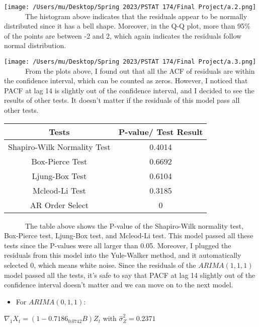 \documentclass[
]{article}
\providecommand{\tightlist}{%
  \setlength{\itemsep}{0pt}\setlength{\parskip}{0pt}}
\begin{document}
\texttt{[image: /Users/mu/Desktop/Spring 2023/PSTAT 174/Final Project/a.2.png]}\\

~~~~~~The histogram above indicates that the residuals appear to be
normally distributed since it has a bell shape. Moreover, in the Q-Q
plot, more than 95\% of the points are between -2 and 2, which again
indicates the residuals follow normal distribution.

\texttt{[image: /Users/mu/Desktop/Spring 2023/PSTAT 174/Final Project/a.3.png]}\\

~~~~~~From the plots above, I found out that all the ACF of residuals
are within the confidence interval, which can be counted as zeros.
However, I noticed that PACF at lag 14 is slightly out of the confidence
interval, and I decided to see the results of other tests. It doesn't
matter if the residuals of this model pass all other tests.

\hfill\break

\begin{longtable}[]{@{}cc@{}}
\toprule\noalign{}
Tests & P-value/ Test Result \\
\midrule\noalign{}
\endhead
\bottomrule\noalign{}
\endlastfoot
Shapiro-Wilk Normality Test & 0.4014 \\
Box-Pierce Test & 0.6692 \\
Ljung-Box Test & 0.6104 \\
Mcleod-Li Test & 0.3185 \\
AR Order Select & 0 \\
\end{longtable}

~~~~~~The table above shows the P-value of the Shapiro-Wilk normality
test, Box-Pierce test, Ljung-Box test, and Mcleod-Li test. This model
passed all these tests since the P-values were all larger than 0.05.
Moreover, I plugged the residuals from this model into the Yule-Walker
method, and it automatically selected 0, which means white noise. Since
the residuals of the \(ARIMA(1,1,1)\) model passed all the tests, it's
safe to say that PACF at lag 14 slightly out of the confidence interval
doesn't matter and we can move on to the next model.

\begin{itemize}
\tightlist
\item
  For \(ARIMA(0,1,1)\):
\end{itemize}

\(\nabla_1X_t = (1-0.7186_{0.0742}B)Z_t\) with
\(\hat{\sigma}^2_Z = 0.2371\)
\end{document}
